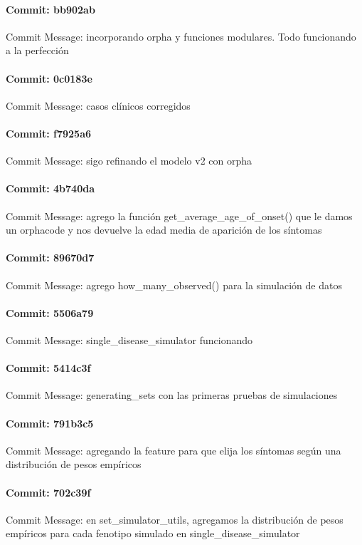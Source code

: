 \documentclass{article}
\begin{document}
\paragraph{Commit: bb902ab}
Commit Message: incorporando orpha y funciones modulares. Todo funcionando a la perfección

\paragraph{Commit: 0c0183e}
Commit Message: casos clínicos corregidos

\paragraph{Commit: f7925a6}
Commit Message: sigo refinando el modelo v2 con orpha

\paragraph{Commit: 4b740da}
Commit Message: agrego la función get_average_age_of_onset() que le damos un orphacode y nos devuelve la edad media de aparición de los síntomas

\paragraph{Commit: 89670d7}
Commit Message: agrego how_many_observed() para la simulación de datos

\paragraph{Commit: 5506a79}
Commit Message: single_disease_simulator funcionando

\paragraph{Commit: 5414c3f}
Commit Message: generating_sets con las primeras pruebas de simulaciones

\paragraph{Commit: 791b3c5}
Commit Message: agregando la feature para que elija los síntomas según una distribución de pesos empíricos

\paragraph{Commit: 702c39f}
Commit Message: en set_simulator_utils, agregamos la distribución de pesos empíricos para cada fenotipo simulado en single_disease_simulator
\end{document}
